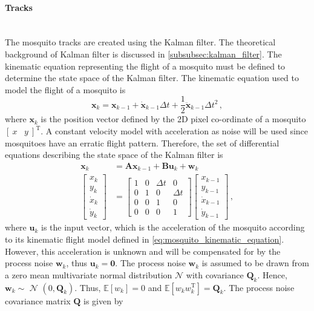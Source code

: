 \paragraph{Tracks}\mbox{}\\
The mosquito tracks are created using the Kalman filter. The theoretical background of Kalman filter is discussed in \autoref{subsubsec:kalman_filter}. The kinematic equation representing the flight of a mosquito must be defined to determine the state space of the Kalman filter. The kinematic equation used to model the flight of a mosquito is
\begin{equation}
  \label{eq:mosquito_kinematic_equation}
  \mathbf{x}_{k} = \mathbf{x}_{k-1} + \mathbf{\dot{x}}_{k-1}\Delta t + \frac{1}{2}\mathbf{\ddot{{x}}}_{k-1}\Delta t^2\,,
\end{equation}
where $\mathbf{x}_{k}$ is the position vector defined by the 2D pixel co-ordinate of a mosquito $[\:x\;\;\;y\:]^\mathrm{T}$. A constant velocity model with acceleration as noise will be used since mosquitoes have an erratic flight pattern. Therefore, the set of differential equations describing the state space of the Kalman filter is
\begin{equation}
  \begin{split}
    \mathbf{x}_k
    & = \mathbf{Ax}_{k-1} + \mathbf{Bu}_k + \mathbf{w}_k \\
    \begin{bmatrix}
      x_k       \\
      y_k       \\
      \dot{x}_k \\
      \dot{y}_k
    \end{bmatrix}
    & =
    \begin{bmatrix}
      1 & 0 & \Delta t & 0        \\
      0 & 1 & 0        & \Delta t \\
      0 & 0 & 1        & 0        \\
      0 & 0 & 0        & 1
    \end{bmatrix}
    \begin{bmatrix}
      x_{k-1}       \\
      y_{k-1}       \\
      \dot{x}_{k-1} \\
      \dot{y}_{k-1}
    \end{bmatrix}\,,
  \end{split}
\end{equation}
where $\mathbf{u}_k$ is the input vector, which is the acceleration of the mosquito according to its kinematic flight model defined in \autoref{eq:mosquito_kinematic_equation}. However, this acceleration is unknown and will be compensated for by the process noise $\mathbf{w}_k$, thus $\mathbf{u}_k = \mathbf{0}$. The process noise $\mathbf{w}_k$ is assumed to be drawn from a zero mean multivariate normal distribution $\mathcal{N}$ with covariance $\mathbf{Q}_k$. Hence, $\mathbf{w}_k \sim$ $\mathcal{N}$ $\left(0, \mathbf{Q}_k\right)$. Thus, $\mathbb{E}[w_k] = 0$ and $\mathbb{E}[w_kw_k^\mathrm{T}] = \mathbf{Q}_k$. The process noise covariance matrix $\mathbf{Q}$ is given by
